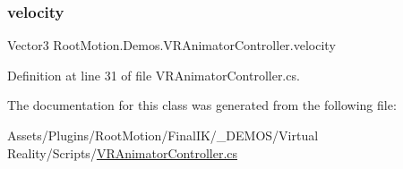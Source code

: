 \subsubsection{\texorpdfstring{velocity}{velocity}}
{\footnotesize\ttfamily Vector3 Root\+Motion.\+Demos.\+V\+R\+Animator\+Controller.\+velocity\hspace{0.3cm}{\ttfamily [get]}}



Definition at line 31 of file V\+R\+Animator\+Controller.\+cs.



The documentation for this class was generated from the following file\+:\begin{DoxyCompactItemize}
\item 
Assets/\+Plugins/\+Root\+Motion/\+Final\+I\+K/\+\_\+\+D\+E\+M\+O\+S/\+Virtual Reality/\+Scripts/\mbox{\hyperlink{_v_r_animator_controller_8cs}{V\+R\+Animator\+Controller.\+cs}}\end{DoxyCompactItemize}
